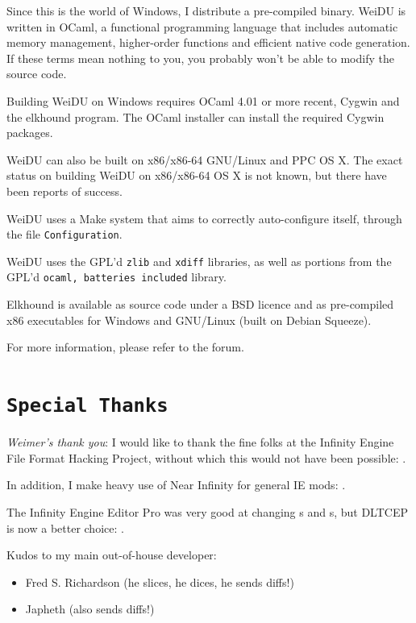\documentclass{article}
\def\ttref#1{\ahrefloc{#1}{\tt #1}}
\def\DEFINE#1{{\tt \bf #1}\label{#1}\index{#1}}
\def\t#1{{\tt #1}}
\begin{document}
Since this is the world of Windows, I distribute a pre-compiled binary.
WeiDU is written in OCaml, a functional programming language that includes
automatic memory management, higher-order functions and efficient native
code generation. If these terms mean nothing to you, you probably won't be
able to modify the source code.

Building WeiDU on Windows requires OCaml 4.01 or more recent, Cygwin and the
elkhound program. The OCaml installer can install the required Cygwin
packages.

WeiDU can also be built on x86/x86-64 GNU/Linux and PPC OS X. The exact status
on building WeiDU on x86/x86-64 OS X is not known, but there have been reports
of success.

WeiDU uses a Make system that aims to correctly auto-configure itself, through
the file \t{Configuration}.

WeiDU uses the GPL'd \t{zlib} and \t{xdiff} libraries, as well as portions from
the GPL'd \t{ocaml, batteries included} library.

Elkhound is available as source code under a BSD licence and as
pre-compiled x86 executables for Windows and GNU/Linux (built on
Debian Squeeze).

For more information, please refer to the forum.

\section{\DEFINE{Special Thanks}}
{\em Weimer's thank you}:
I would like to thank the fine folks at the Infinity Engine File Format
Hacking Project, without which this would not have been possible:
.

In addition, I make heavy use of Near Infinity for general IE mods: .

The Infinity Engine Editor Pro was very good at changing \ttref{ITM}s and
\ttref{SPL}s, but DLTCEP is now a better choice:
.

Kudos to my main out-of-house developer:
\begin{itemize}
\item Fred S. Richardson (he slices, he dices, he sends diffs!)
\item Japheth (also sends diffs!)
\end{itemize}
\end{document}
